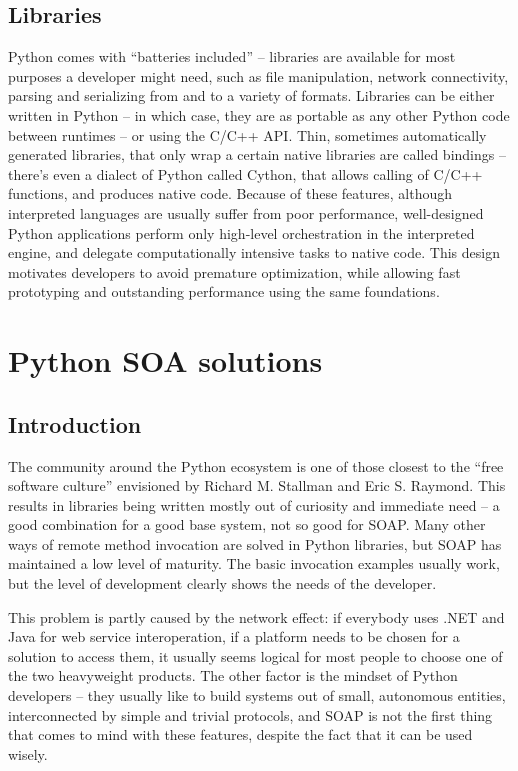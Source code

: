 \subsection{Libraries}

Python comes with ``batteries included'' -- libraries are available for most purposes a developer might need, such as file manipulation, network connectivity, parsing and serializing from and to a variety of formats. Libraries can be either written in Python -- in which case, they are as portable as any other Python code between runtimes -- or using the C/C++ API. Thin, sometimes automatically generated libraries, that only wrap a certain native libraries are called bindings -- there's even a dialect of Python called Cython, that allows calling of C/C++ functions, and produces native code. Because of these features, although interpreted languages are usually suffer from poor performance, well-designed Python applications perform only high-level orchestration in the interpreted engine, and delegate computationally intensive tasks to native code. This design motivates developers to avoid premature optimization, while allowing fast prototyping and outstanding performance using the same foundations.

\section{Python SOA solutions}

\subsection{Introduction}

The community around the Python ecosystem is one of those closest to the ``free software culture'' envisioned by Richard M. Stallman and Eric S. Raymond. This results in libraries being written mostly out of curiosity and immediate need -- a good combination for a good base system, not so good for SOAP. Many other ways of remote method invocation are solved in Python libraries, but SOAP has maintained a low level of maturity. The basic invocation examples usually work, but the level of development clearly shows the needs of the developer.

This problem is partly caused by the network effect: if everybody uses .NET and Java for web service interoperation, if a platform needs to be chosen for a solution to access them, it usually seems logical for most people to choose one of the two heavyweight products. The other factor is the mindset of Python developers -- they usually like to build systems out of small, autonomous entities, interconnected by simple and trivial protocols, and SOAP is not the first thing that comes to mind with these features, despite the fact that it can be used wisely.

